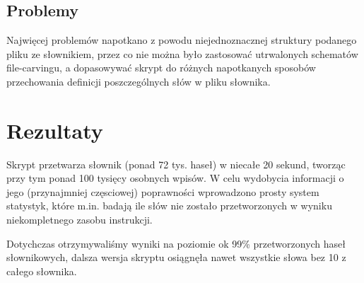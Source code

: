 \documentclass[12pt]{article}
\begin{document}
\subsection{Problemy}
Najwięcej problemów napotkano z powodu niejednoznacznej struktury podanego pliku ze słownikiem,
przez co nie można było zastosować utrwalonych schematów file-carvingu, a dopasowywać skrypt do różnych
napotkanych sposobów przechowania definicji poszczególnych słów w pliku słownika.

\section{Rezultaty}
Skrypt przetwarza słownik (ponad 72 tys. haseł) w niecałe 20 sekund, tworząc przy tym ponad 100 tysięcy osobnych wpisów.
W celu wydobycia informacji o jego (przynajmniej częsciowej) poprawności wprowadzono prosty system statystyk, które m.in. 
badają ile słów nie zostało przetworzonych w wyniku niekompletnego zasobu instrukcji.

Dotychczas otrzymywaliśmy wyniki na poziomie ok 99\% przetworzonych haseł słownikowych, dalsza wersja skryptu osiągnęła
nawet wszystkie słowa bez 10 z całego słownika.
\end{document}
